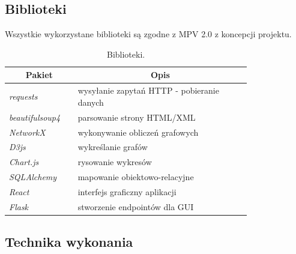 \subsection{Biblioteki}
Wszystkie wykorzystane biblioteki są zgodne z MPV 2.0 z koncepcji projektu.
 \begin{longtable}{| m{0.2\linewidth} |  m{0.6\linewidth} |} 
     \caption{Biblioteki.} \\ 
     \hline
      \multicolumn{1}{|c|}{Pakiet} & \multicolumn{1}{c|}{Opis} \\ \hline \endfirsthead
    
     \endfoot
     \hline \endlastfoot
    \textit{requests} & wysyłanie zapytań HTTP - pobieranie danych \\ \hline
    \textit{beautifulsoup4} & parsowanie strony HTML/XML \\ \hline
    \textit{NetworkX} & wykonywanie obliczeń grafowych \\ \hline
    \textit{D3js} & wykreślanie grafów \\ \hline   
    \textit{Chart.js} & rysowanie wykresów \\ \hline
    \textit{SQLAlchemy} & mapowanie obiektowo-relacyjne \\ \hline
    \textit{React} & interfejs graficzny aplikacji \\ \hline
    \textit{Flask} & stworzenie endpointów dla GUI\\ \hline
\end{longtable}

\subsection{Technika wykonania}

